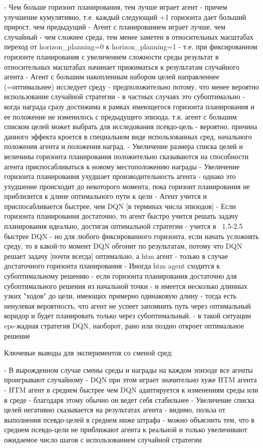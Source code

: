 \documentclass[a4paper]{article}
\begin{document}
- Чем больше горизонт планирования, тем лучше играет агент
  - причем улучшение кумулятивно, т.е. каждый следующий +1 горизонта дает больший прирост, чем предыдущий
- Агент с планированием играет лучше, чем случайный
  - чем сложнее среда, тем менее заметен в относительных масштабах переход от horizon\_planning=0 к horizon\_planning=1
  - т.е. при фиксированном горизонте планирования с увеличением сложности среды результат в относительных масштабах начинает прижиматься к результатам случайного агента
- Агент с большим накопленным набором целей направленнее (=оптимальнее) исследует среду
  - предположительно потому, что менее вероятно использование случайной стратегии
  - в частных случаях это субоптимально - когда награда сразу достижима в рамках имеющегося горизонта планирования и ее положение не изменилось с предыдущего эпизода, т.к. агент с большим списком целей может выбрать для исследования псевдо-цель
  - вероятно, причина данного эффекта кроется в специальном виде использованных сред, начального положения агента и положения наград.
- Увеличение размера списка целей и величины горизонта планирования положительно сказываются на способности агента приспосабливаться к новому местоположению награды
- Увеличение горизонта планирования ухудшает производительность агента
  - однако это ухудшение происходит до некоторого момента, пока горизонт планирования не приблизится к длине оптимального пути к цели
- Агент учится и приспосабливается быстрее, чем DQN [в терминах числа эпизодов]
- Если горизонта планирования достаточно, то агент быстро учится решать задачу планирования идеально, достигая оптимальной стратегии
  - учится в ~1.5-2.5 быстрее DQN
  - но для любого фиксированного горизонта, если начать усложнять среду, то в какой-то момент DQN обгонит по результатам, потому что DQN решает задачу [почти всегда] оптимально, а htm агент - только в случае достаточного горизонта планирования
- Иногда htm agent сходится к субоптимальному решению
  - если горизонта планирования достаточно для субоптимального решения из начальной точки
  - и имеется несколько длинных узких "ходов" до цели, имеющих примерно одинаковую длину
  - тогда есть ненулевая вероятность, что агент не успеет запомнить путь через оптимальный коридор и будет планировать только через субоптимальный.
  - в такой ситуации eps-жадная стратегия DQN, наоборот, рано или поздно откроет оптимальное решение

Ключевые выводы для экспериментов со сменой сред:

- В вырожденном случае смены среды и награды на каждом эпизоде все агенты проигрывают случайному
  - DQN при этом играет значительно хуже HTM агента
- HTM агент в среднем быстрее чем DQN адаптируется к изменениям среды или в среде
  - благодаря этому обычно он ведет себя стабильнее
- Увеличение списка целей негативно сказывается на результатах агента
  - видимо, польза от выполнения псевдо-целей в среднем ниже штрафа
  - можно объяснить тем, что в среднем псевдо-цели не приближают агента к реальной и только увеличивают ожидаемое число шагов с использованием случайной стратегии
\end{document}
